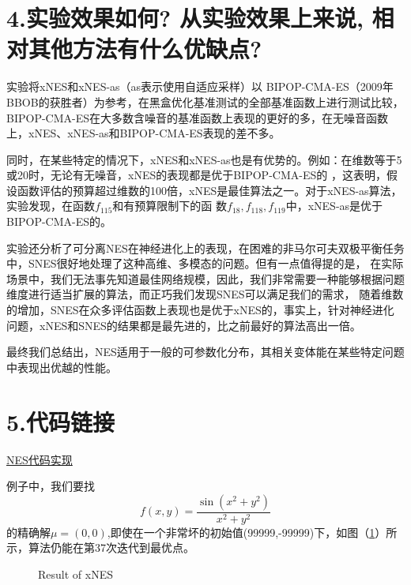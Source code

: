 \documentclass[lang=cn,11pt,cite=super]{elegantpaper}
\begin{document}
\section*{\textcolor[RGB]{60,113,183}{4.实验效果如何? 从实验效果上来说, 相对其他方法有什么优缺点?}}
实验将xNES和xNES-as（as表示使用自适应采样）以 BIPOP-CMA-ES（2009年BBOB的获胜者）为参考，在黑盒优化基准测试的全部基准函数上进行测试比较，
BIPOP-CMA-ES在大多数含噪音的基准函数上表现的更好的多，在无噪音函数上，xNES、xNES-as和BIPOP-CMA-ES表现的差不多。
\par
同时，在某些特定的情况下，xNES和xNES-as也是有优势的。例如：在维数等于5或20时，无论有无噪音，xNES的表现都是优于BIPOP-CMA-ES的
，这表明，假设函数评估的预算超过维数的100倍，xNES是最佳算法之一。对于xNES-as算法，实验发现，在函数$f_{115}$和有预算限制下的函
数$f_{18},f_{118},f_{119}$中，xNES-as是优于BIPOP-CMA-ES的。
\par
实验还分析了可分离NES在神经进化上的表现，在困难的非马尔可夫双极平衡任务中，SNES很好地处理了这种高维、多模态的问题。但有一点值得提的是，
在实际场景中，我们无法事先知道最佳网络规模，因此，我们非常需要一种能够根据问题维度进行适当扩展的算法，而正巧我们发现SNES可以满足我们的需求，
随着维数的增加，SNES在众多评估函数上表现也是优于xNES的，事实上，针对神经进化问题，xNES和SNES的结果都是最先进的，比之前最好的算法高出一倍。
\par
最终我们总结出，NES适用于一般的可参数化分布，其相关变体能在某些特定问题中表现出优越的性能。
\newpage
\section*{\textcolor[RGB]{60,113,183}{5.代码链接}}
\href{https://github.com/xieshanjie/The-Final-Project-of-Optimization--NES/blob/main/nes.py}{NES代码实现}
\par
例子中，我们要找
\begin{equation*}
    f(x,y)= \frac{\sin (x^2+y^2)}{x^2+y^2}
\end{equation*}
的精确解$\mu = (0,0)$,即使在一个非常坏的初始值(99999,-99999)下，如图（\ref{xNES_res}）所示，算法仍能在第37次迭代到最优点。
\begin{figure}[htbp]
    \centering
    \quad
    \caption{Result of xNES \label{xNES_res}}
\end{figure}
 
\end{document}
